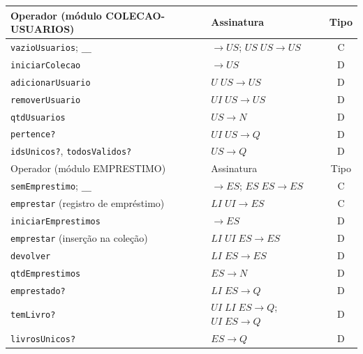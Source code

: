 \documentclass[a4paper,12pt]{article}
\begin{document}
\begin{center}
\small
\begin{tabularx}{\linewidth}{@{}Y l c@{}}
\toprule
Operador (módulo COLECAO-USUARIOS) & Assinatura & Tipo \\
\midrule
\texttt{vazioUsuarios}; \texttt{\_\_} & $\to US$; $US\;US\to US$ & C \\
\texttt{iniciarColecao} & $\to US$ & D \\
\texttt{adicionarUsuario} & $U\;US\to US$ & D \\
\texttt{removerUsuario} & $UI\;US\to US$ & D \\
\texttt{qtdUsuarios} & $US\to N$ & D \\
\texttt{pertence?} & $UI\;US\to Q$ & D \\
\texttt{idsUnicos?}, \texttt{todosValidos?} & $US\to Q$ & D \\
\midrule
Operador (módulo EMPRESTIMO) & Assinatura & Tipo \\
\midrule
\texttt{semEmprestimo}; \texttt{\_\_} & $\to ES$; $ES\;ES\to ES$ & C \\
\texttt{emprestar} (registro de empréstimo) & $LI\;UI\to ES$ & C \\
\texttt{iniciarEmprestimos} & $\to ES$ & D \\
\texttt{emprestar} (inserção na coleção) & $LI\;UI\;ES\to ES$ & D \\
\texttt{devolver} & $LI\;ES\to ES$ & D \\
\texttt{qtdEmprestimos} & $ES\to N$ & D \\
\texttt{emprestado?} & $LI\;ES\to Q$ & D \\
\texttt{temLivro?} & $UI\;LI\;ES\to Q$; $UI\;ES\to Q$ & D \\
\texttt{livrosUnicos?} & $ES\to Q$ & D \\
\bottomrule
\end{tabularx}
\end{center}
\end{document}
